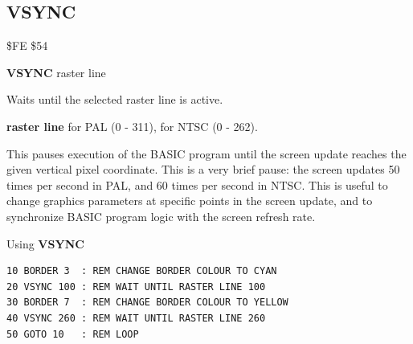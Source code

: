 \subsection{VSYNC}
\begin{description}[leftmargin=2cm,style=nextline]
\item [Token:]    \$FE \$54

\item [Format:]   {\bf VSYNC} raster line

\item [Usage:]    Waits until the selected raster line is active.

                  {\bf raster line} for PAL (0 - 311), for NTSC (0 - 262).

                  This pauses execution of the BASIC program until the screen update reaches the given vertical pixel coordinate. This is a very brief pause: the screen updates 50 times per second in PAL, and 60 times per second in NTSC. This is useful to change graphics parameters at specific points in the screen update, and to synchronize BASIC program logic with the screen refresh rate.

\item [Example:]  Using {\bf VSYNC}

\begin{tcolorbox}[colback=black,coltext=white]
\verbatimfont{\codefont}
\begin{verbatim}
10 BORDER 3  : REM CHANGE BORDER COLOUR TO CYAN
20 VSYNC 100 : REM WAIT UNTIL RASTER LINE 100
30 BORDER 7  : REM CHANGE BORDER COLOUR TO YELLOW
40 VSYNC 260 : REM WAIT UNTIL RASTER LINE 260
50 GOTO 10   : REM LOOP
\end{verbatim}
\end{tcolorbox}
\end{description}


\newpage
